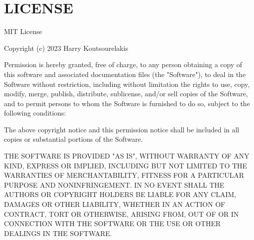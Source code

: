 \chapter{LICENSE}
\hypertarget{md__2home_2harrkout_2github_2Leshan-OMA-Lightweight-M2M-server-for-Zephyr-_2LICENSE}{}\label{md__2home_2harrkout_2github_2Leshan-OMA-Lightweight-M2M-server-for-Zephyr-_2LICENSE}
MIT License

Copyright (c) 2023 Harry Koutsourelakis

Permission is hereby granted, free of charge, to any person obtaining a copy of this software and associated documentation files (the "{}\+Software"{}), to deal in the Software without restriction, including without limitation the rights to use, copy, modify, merge, publish, distribute, sublicense, and/or sell copies of the Software, and to permit persons to whom the Software is furnished to do so, subject to the following conditions\+:

The above copyright notice and this permission notice shall be included in all copies or substantial portions of the Software.

THE SOFTWARE IS PROVIDED "{}\+AS IS"{}, WITHOUT WARRANTY OF ANY KIND, EXPRESS OR IMPLIED, INCLUDING BUT NOT LIMITED TO THE WARRANTIES OF MERCHANTABILITY, FITNESS FOR A PARTICULAR PURPOSE AND NONINFRINGEMENT. IN NO EVENT SHALL THE AUTHORS OR COPYRIGHT HOLDERS BE LIABLE FOR ANY CLAIM, DAMAGES OR OTHER LIABILITY, WHETHER IN AN ACTION OF CONTRACT, TORT OR OTHERWISE, ARISING FROM, OUT OF OR IN CONNECTION WITH THE SOFTWARE OR THE USE OR OTHER DEALINGS IN THE SOFTWARE. 